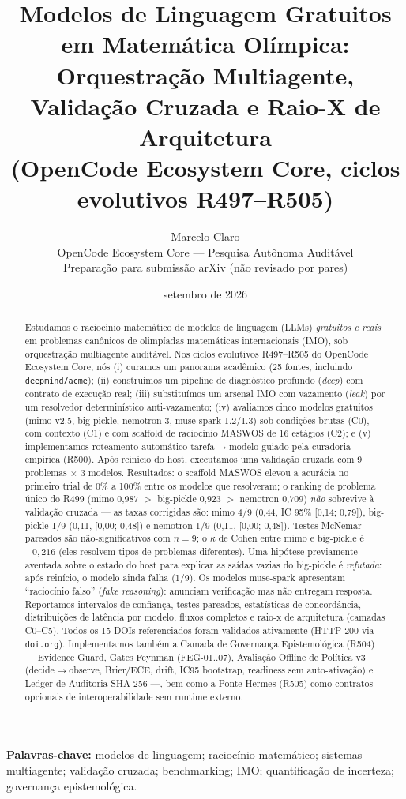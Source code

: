 \documentclass[11pt,letterpaper]{article}
\title{\bfseries Modelos de Linguagem Gratuitos em Matemática Olímpica:\\ Orquestração Multiagente, Validação Cruzada e Raio-X de Arquitetura\\
\large (OpenCode Ecosystem Core, ciclos evolutivos R497--R505)}
\author{Marcelo Claro\\
\small OpenCode Ecosystem Core --- Pesquisa Autônoma Auditável\\
\small Preparação para submissão arXiv (não revisado por pares)}
\date{setembro de 2026}
\begin{document}
\maketitle

\begin{abstract}
\noindent Estudamos o raciocínio matemático de modelos de linguagem (LLMs)
\emph{gratuitos e reais} em problemas canônicos de olimpíadas matemáticas
internacionais (IMO), sob orquestração multiagente auditável. Nos ciclos
evolutivos R497--R505 do OpenCode Ecosystem Core, nós (i) curamos um
panorama acadêmico (25 fontes, incluindo \texttt{deepmind/acme});
(ii) construímos um pipeline de diagnóstico profundo (\emph{deep}) com
contrato de execução real; (iii) substituímos um arsenal IMO com vazamento
(\emph{leak}) por um resolvedor determinístico anti-vazamento;
(iv) avaliamos cinco modelos gratuitos (mimo-v2.5, big-pickle, nemotron-3,
muse-spark-1.2/1.3) sob condições brutas (C0), com contexto (C1) e com
scaffold de raciocínio MASWOS de 16 estágios (C2); e (v) implementamos
roteamento automático tarefa$\rightarrow$modelo guiado pela curadoria
empírica (R500). Após reinício do host, executamos uma validação cruzada
com 9 problemas $\times$ 3 modelos. Resultados: o scaffold MASWOS elevou a
acurácia no primeiro trial de 0\% a 100\% entre os modelos que resolveram;
o ranking de problema único do R499 (mimo 0,987 $>$ big-pickle 0,923 $>$
nemotron 0,709) \emph{não} sobrevive à validação cruzada --- as taxas
corrigidas são: mimo 4/9 (0,44, IC 95\% [0,14; 0,79]), big-pickle 1/9
(0,11, [0,00; 0,48]) e nemotron 1/9 (0,11, [0,00; 0,48]). Testes McNemar
pareados são não-significativos com $n=9$; o $\kappa$ de Cohen entre mimo e
big-pickle é $-0,216$ (eles resolvem tipos de problemas diferentes). Uma
hipótese previamente aventada sobre o estado do host para explicar as saídas
vazias do big-pickle é \emph{refutada}: após reinício, o modelo ainda falha
(1/9). Os modelos muse-spark apresentam ``raciocínio falso'' (\emph{fake
reasoning}): anunciam verificação mas não entregam resposta. Reportamos
intervalos de confiança, testes pareados, estatísticas de concordância,
distribuições de latência por modelo, fluxos completos e raio-x de
arquitetura (camadas C0--C5). Todos os 15 DOIs referenciados foram validados
ativamente (HTTP 200 via \texttt{doi.org}). Implementamos também a Camada
de Governança Epistemológica (R504) --- Evidence Guard, Gates Feynman
(FEG-01..07), Avaliação Offline de Política v3 (decide$\rightarrow$observe,
Brier/ECE, drift, IC95 bootstrap, readiness sem auto-ativação) e Ledger de
Auditoria SHA-256 ---, bem como a Ponte Hermes (R505) como contratos
opcionais de interoperabilidade sem runtime externo.
\end{abstract}

\noindent\textbf{Palavras-chave:} modelos de linguagem; raciocínio
matemático; sistemas multiagente; validação cruzada; benchmarking; IMO;
quantificação de incerteza; governança epistemológica.








\end{document}

